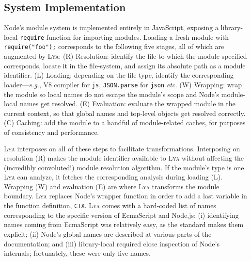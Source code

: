 \documentclass[letterpaper,twocolumn,10pt]{article}
\def\eg{{\em e.g.}, }
\def\etc{{\em etc.}\xspace}
\newcommand{\ttt}[1]{\texttt{#1}}
\newcommand{\sx}[1]{(\S\ref{#1})}
\newcommand{\sys}{{\scshape Lya}\xspace}
\begin{document}

\subsection{System Implementation}
\label{impl1}


Node's module system is implemented entirely in JavaScript, exposing a library-local \ttt{require} function for importing modules.
Loading a fresh module with \ttt{require("foo");} corresponds to the following five stages, all of which are augmented by \sys:
(R) Resolution: identify the file to which the module specified corresponds, locate it in the file-system, and assign its absolute path as a module identifier.
(L) Loading: depending on the file type, identify the corresponding loader---\eg V8 compiler for \ttt{js}, \ttt{JSON.parse} for \ttt{json} \etc
(W) Wrapping: wrap the module so local names do not escape the module's scope and Node's module-local names get resolved.
(E) Evaluation: evaluate the wrapped module in the current context, so that global names and top-level objects get resolved correctly.
(C) Caching: add the module to a handful of module-related caches, for purposes of consistency and performance.

\sys interposes on all of these steps to facilitate transformations.
Interposing on resolution (R) makes the module identifier available to \sys without affecting the (incredibly convoluted!) module resolution algorithm.
If the module's type is one \sys can analyze, it fetches the corresponding analysis during loading (L).
Wrapping (W) and evaluation (E) are where \sys transforms the module boundary.
\sys replaces Node's wrapper function in order to add a last variable in the function definition, \ttt{CTX}.
\sys comes with a hard-coded list of names corresponding to the specific version of EcmaScript and Node.js:
  (i) identifying names coming from EcmaScript was relatively easy, as the standard makes them explicit;
  (ii) Node's global names are described at various parts of the documentation; and
  (iii) library-local required close inspection of Node's internals; fortunately, these were only five names.
\end{document}
